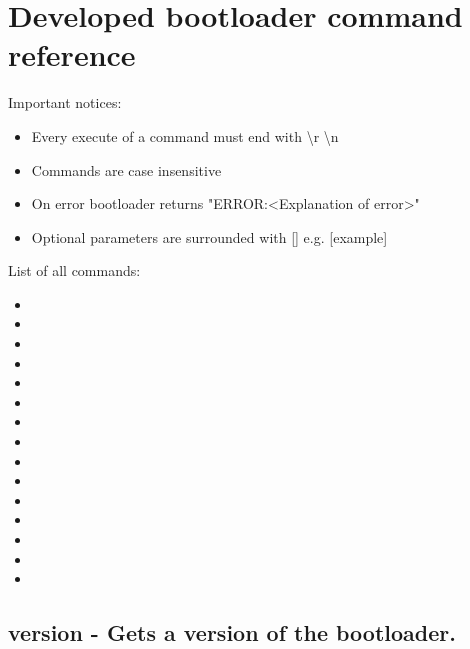 \chapter{Developed bootloader command reference} %
\label{appendix_cmd_ref_bootloader}

Important notices:

\begin{itemize}
 \item Every execute of a command must end with \textbackslash r \textbackslash n

 \item Commands are case insensitive
 
 \item On error bootloader returns "ERROR:<Explanation of error>"
 
 \item Optional parameters are surrounded with [] e.g. [example]

\end{itemize}

\noindent List of all commands:

\begin{itemize}

    \item {}
    \item {}
    \item {}
    \item {}
    \item {}
    \item {}
    \item {}
    \item {}
    \item {}
    \item {} 
    \item {}
    \item {}
    \item {}
    \item {}
    \item {}

\end{itemize}



\section{version - Gets a version of the bootloader.}
\label{bl_cmd:version}

